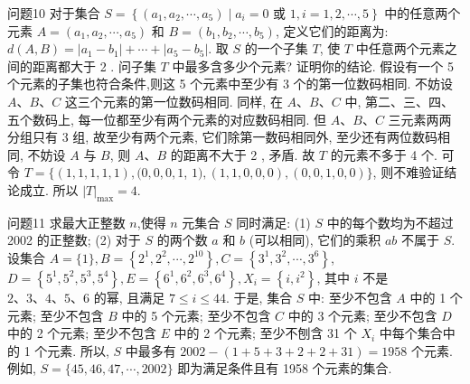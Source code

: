 问题10 对于集合 $S=\left\{\left(a_1, a_2, \cdots, a_5\right) \mid a_i=0\right.$ 或 $\left.1, i=1,2, \cdots, 5\right\}$ 中的任意两个元素 $A=\left(a_1, a_2, \cdots, a_5\right)$ 和 $B=\left(b_1, b_2, \cdots, b_5\right)$, 定义它们的距离为: $d(A, B)=\left|a_1-b_1\right|+\cdots+\left|a_5-b_5\right|$. 取 $S$ 的一个子集 $T$, 使 $T$ 中任意两个元素之间的距离都大于 2 . 问子集 $T$ 中最多含多少个元素? 证明你的结论.
假设有一个 5 个元素的子集也符合条件,则这 5 个元素中至少有 3 个的第一位数码相同.
不妨设 $A 、 B 、 C$ 这三个元素的第一位数码相同.
同样, 在 $A 、 B 、 C$ 中, 第二、三、四、五个数码上, 每一位都至少有两个元素的对应数码相同.
但 $A 、 B 、 C$ 三元素两两分组只有 3 组, 故至少有两个元素, 它们除第一数码相同外, 至少还有两位数码相同, 不妨设 $A$ 与 $B$, 则 $A 、 B$ 的距离不大于 2 , 矛盾.
故 $T$ 的元素不多于 4 个.
可令 $T=\{(1,1,1,1,1),(0,0,0,1$, $1),(1,1,0,0,0),(0,0,1,0,0)\}$, 则不难验证结论成立.
所以 $|T|_{\max }=4$.



问题11 求最大正整数 $n$,使得 $n$ 元集合 $S$ 同时满足:
(1) $S$ 中的每个数均为不超过 2002 的正整数;
(2) 对于 $S$ 的两个数 $a$ 和 $b$ (可以相同), 它们的乘积 $a b$ 不属于 $S$.
设集合 $A=\{1\}, B=\left\{2^1, 2^2, \cdots, 2^{10}\right\}, C=\left\{3^1, 3^2, \cdots, 3^6\right\}$, $D=\left\{5^1, 5^2, 5^3, 5^4\right\}, E=\left\{6^1, 6^2, 6^3, 6^4\right\}, X_i=\left\{i, i^2\right\}$, 其中 $i$ 不是 $2 、 3 、 4 、 5 、 6$ 的幂, 且满足 $7 \leqslant i \leqslant 44$. 于是, 集合 $S$ 中: 至少不包含 $A$ 中的 1 个元素; 至少不包含 $B$ 中的 5 个元素; 至少不包含 $C$ 中的 3 个元素; 至少不包含 $D$ 中的 2 个元素; 至少不包含 $E$ 中的 2 个元素; 至少不刨含 31 个 $X_i$ 中每个集合中的 1 个元素.
所以, $S$ 中最多有 $2002-(1+5+3+2+2+31)=1958$ 个元素.
例如, $S=\{45,46,47, \cdots, 2002\}$ 即为满足条件且有 1958 个元素的集合.



